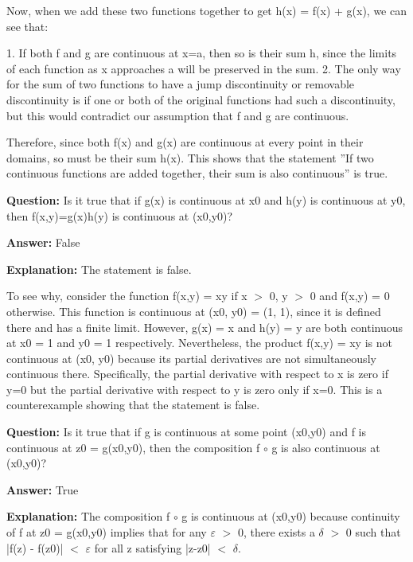 \documentclass{article}
\begin{document}
Now, when we add these two functions together to get h(x) = f(x) + g(x), we can see that:

1. If both f and g are continuous at x=a, then so is their sum h, since the limits of each function as x approaches a will be preserved in the sum.
2. The only way for the sum of two functions to have a jump discontinuity or removable discontinuity is if one or both of the original functions had such a discontinuity, but this would contradict our assumption that f and g are continuous.

Therefore, since both f(x) and g(x) are continuous at every point in their domains, so must be their sum h(x). This shows that the statement ''If two continuous functions are added together, their sum is also continuous'' is true.
                
                \vspace{0.5cm} 
        
            
                \textbf {Question:} Is it true that if g(x) is continuous at x0 and h(y) is continuous at y0, then f(x,y)=g(x)h(y) is continuous at (x0,y0)?
                
                \textbf{Answer:} False

                \textbf{Explanation:} The statement is false.

To see why, consider the function f(x,y) = xy if x \ensuremath{>} 0, y \ensuremath{>} 0 and f(x,y) = 0 otherwise. This function is continuous at (x0, y0) = (1, 1), since it is defined there and has a finite limit. However, g(x) = x and h(y) = y are both continuous at x0 = 1 and y0 = 1 respectively. Nevertheless, the product f(x,y) = xy is not continuous at (x0, y0) because its partial derivatives are not simultaneously continuous there. Specifically, the partial derivative with respect to x is zero if y=0 but the partial derivative with respect to y is zero only if x=0. This is a counterexample showing that the statement is false.
                
                \vspace{0.5cm} 
        
            
                \textbf {Question:} Is it true that if g is continuous at some point (x0,y0) and f is continuous at z0 = g(x0,y0), then the composition f \ensuremath{\circ} g is also continuous at (x0,y0)?
                
                \textbf{Answer:} True

                \textbf{Explanation:} The composition f \ensuremath{\circ} g is continuous at (x0,y0) because continuity of f at z0 = g(x0,y0) implies that for any \ensuremath{\varepsilon} \ensuremath{>} 0, there exists a \ensuremath{\delta} \ensuremath{>} 0 such that |f(z) - f(z0)| \ensuremath{<} \ensuremath{\varepsilon} for all z satisfying |z-z0| \ensuremath{<} \ensuremath{\delta}. 
\end{document}
